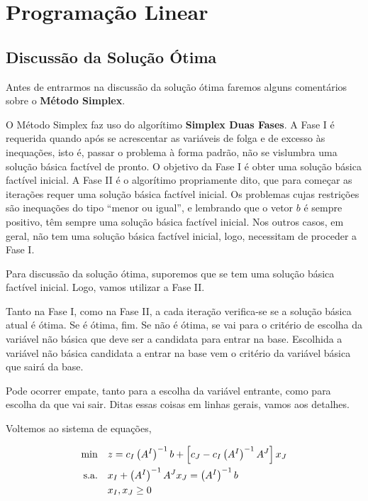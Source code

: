 
\chapter{Programação Linear}

\section{Discussão da Solução Ótima} %

Antes de entrarmos na discussão da solução ótima faremos alguns comentários sobre
o \textbf{Método Simplex}.

O Método Simplex faz uso do algorítimo \textbf{Simplex Duas Fases}.
A Fase I é requerida quando após se acrescentar as variáveis de folga e de excesso
às inequações, isto é, passar o problema à forma padrão, não se vislumbra uma
solução básica factível de pronto.
O objetivo da Fase I é obter uma solução básica factível inicial.
A Fase II é o algorítimo propriamente dito, que para começar as iterações requer
uma solução básica factível inicial.
Os problemas cujas restrições são inequações do tipo ``menor ou igual'', e lembrando
que o vetor $ b $ é sempre positivo, têm sempre uma solução básica factível
inicial.
Nos outros casos, em geral, não tem uma solução básica factível inicial, logo,
necessitam de proceder a Fase I.

Para discussão da solução ótima, suporemos que se tem uma solução básica factível
inicial.
Logo, vamos utilizar a Fase II.

Tanto na Fase I, como na Fase II, a cada iteração verifica-se se a solução básica
atual é ótima.
Se é ótima, fim.
Se não é ótima, se vai para o critério de escolha da variável não básica que deve 
ser a candidata para entrar na base.
Escolhida a variável não básica candidata a entrar na base vem o critério da 
variável básica que sairá da base.

Pode ocorrer empate, tanto para a escolha da variável entrante, como para escolha
da que vai sair.
Ditas essas coisas em linhas gerais, vamos aos detalhes.

Voltemos ao sistema de equações,

\begin{align*}
  \min \quad        & z = c_I \left(A^{I}\right)^{-1} b + \left[c_J - c_I \left(A^{I}\right)^{-1} A^{J}\right] x_J\\
  \text{s.a.} \quad & x_I + \left(A^{I}\right)^{-1} A^{J} x_J = \left(A^{I}\right)^{-1} b \\
                    & x_I, x_J \geq 0
\end{align*}

